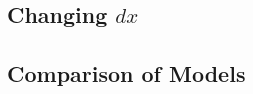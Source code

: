 \documentclass[SingleSpace,12pt,Proceedings]{Serre_ASCE}
\begin{document}
\subsection{Changing $dx$}

\subsection{Comparison of Models}

\end{document}

